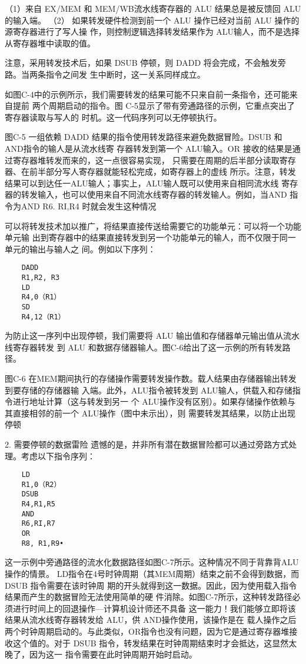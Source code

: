 （1）来自 EX/MEM 和 MEM/WB流水线寄存器的 ALU 结果总是被反馈回 ALU的输入端。
（2） 如果转发硬件检测到前一个 ALU 操作已经对当前 ALU 操作的源寄存器进行了写人操
作，则控制逻辑选择转发结果作为 ALU输人，而不是选择从寄存器堆中读取的值。

注意，采用转发技术后，如果 DSUB 停顿，则 DADD 将会完成，不会触发旁路。当两条指令之间发
生中断时，这一关系同样成立。

如图C-4中的示例所示，我们需要转发的结果可能不只来自前一条指令，还可能来自提前
两个周期启动的指令。图 C-5显示了带有旁通路径的示例，它重点突出了寄存器读取与写人的
时机。这一代码序列可以无停顿执行。

图C-5 一组依赖 DADD 结果的指令使用转发路径来避免数据冒险。DSUB 和 AND指令的输人是从流水线寄
存器转发到第一个 ALU输入。OR 接收的结果是通过寄存器堆转发而来的，这一点很容易实现，
只需要在周期的后半部分读取寄存器、在前半部分写人寄存器就能轻松完成，如寄存器上的虚线
所示。注意，转发结果可以到达任一ALU输人；事实上，ALU输人既可以使用来自相同流水线
寄存器的转发输入，也可以使用来自不同流水线寄存器的转发输人。例如，当AND 指令为AND R6.
RI,R4 时就会发生这种情况

可以将转发技术加以推广，将结果直接传送给需要它的功能单元：可以将一个功能单元输
出到寄存器中的结果直接转发到另一个功能单元的输人，而不仅限于同一单元的输出与输人之
间。例如以下序列：
\begin{verbatim}
    DADD
    R1,R2, R3
    LD
    R4,0（R1）
    SD
    R4,12（R1）
\end{verbatim}
为防止这一序列中出现停顿，我们需要将 ALU 输出值和存储器单元输出值从流水线寄存器转发
到 ALU 和数据存储器输人。图C-6给出了这一示例的所有转发路径。

图C-6 在MEM期间执行的存储操作需要转发操作数。载人结果由存储器输出转发到要存储的存储器输
入端。此外，ALU指令被转发到 ALU输人，供载入和存储指令进行地址计算（这与转发到另一
个 ALU操作没有区别）。如果存储操作依赖与其直接相邻的前一个 ALU操作（图中未示出），则
需要转发其结果，以防止出现停顿

2. 需要停顿的数据雷险
遗憾的是，并非所有潜在数据冒险都可以通过旁路方式处理。考虑以下指令序列：
\begin{verbatim}
    LD
    R1,0（R2）
    DSUB
    R4,R1,R5
    AND
    R6,RI,R7
    OR
    R8, R1,R9•
\end{verbatim}
这一示例中旁通路径的流水化数据路径如图C-7所示。这种情况不同于背靠背ALU操作的情景。
LD指令在4号时钟周期（其MEM周期）结束之前不会得到数据，而 DSUB 指令需要在该时钟周
期的开头就得到这一数据。因此，因为使用载入指令结果而产生的数据冒险无法使用简单的硬
件消除。如图C-7所示，这种转发路径必须进行时间上的回退操作—计算机设计师还不具备
这一能力！我们能够立即将该结果从流水线寄存器转发给 ALU，供 AND操作使用，该操作是在
载人操作之后两个时钟周期启动的。与此类似，OR指令也没有问题，因为它是通过寄存器堆接
收这个值的。对于 DSUB 指令，转发结果在时钟周期结束时才会抵达，这显然太晚了，因为这一
指令需要在此时钟周期开始时启动。

